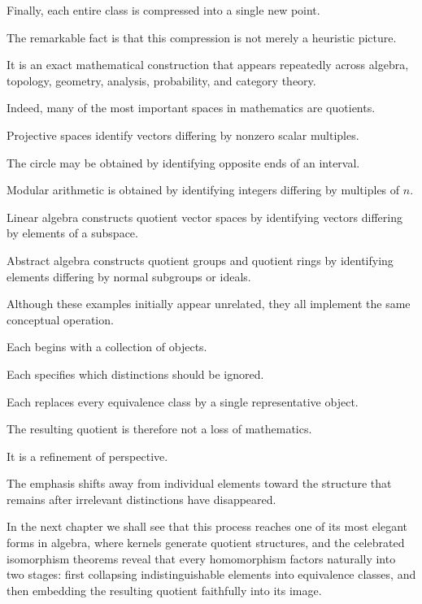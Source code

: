 \documentclass[11pt]{book}
\numberwithin{equation}{chapter}
\theoremstyle{definition}
\theoremstyle{plain}
\theoremstyle{remark}
\begin{document}
Finally, each entire class is compressed into a single new point.

The remarkable fact is that this compression is not merely a heuristic picture.

It is an exact mathematical construction that appears repeatedly across algebra, topology, geometry, analysis, probability, and category theory.

Indeed, many of the most important spaces in mathematics are quotients.

Projective spaces identify vectors differing by nonzero scalar multiples.

The circle may be obtained by identifying opposite ends of an interval.

Modular arithmetic is obtained by identifying integers differing by multiples of \(n\).

Linear algebra constructs quotient vector spaces by identifying vectors differing by elements of a subspace.

Abstract algebra constructs quotient groups and quotient rings by identifying elements differing by normal subgroups or ideals.

Although these examples initially appear unrelated, they all implement the same conceptual operation.

Each begins with a collection of objects.

Each specifies which distinctions should be ignored.

Each replaces every equivalence class by a single representative object.

The resulting quotient is therefore not a loss of mathematics.

It is a refinement of perspective.

The emphasis shifts away from individual elements toward the structure that remains after irrelevant distinctions have disappeared.

In the next chapter we shall see that this process reaches one of its most elegant forms in algebra, where kernels generate quotient structures, and the celebrated isomorphism theorems reveal that every homomorphism factors naturally into two stages: first collapsing indistinguishable elements into equivalence classes, and then embedding the resulting quotient faithfully into its image.

\end{document}
